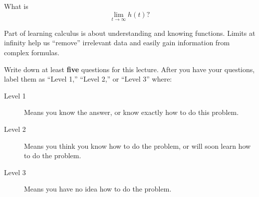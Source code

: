 \documentclass{ximera}
\begin{document}
\begin{problem}
What is 
\[
\lim_{t\to\infty} h(t)?
\]
\begin{multipleChoice}
\end{multipleChoice}
\end{problem}

Part of learning calculus is about understanding and knowing
functions. Limits at infinity help us ``remove'' irrelevant data and
easily gain information from complex formulas.

\begin{problem}
Write down at least \textbf{five} questions for this lecture. After
you have your questions, label them as ``Level 1,'' ``Level 2,'' or ``Level 3'' where:
\begin{description}
\item[Level 1] Means you know the answer, or know exactly how to do this problem.
\item[Level 2] Means you think you know how to do the problem, or will soon learn how to do the problem.
\item[Level 3] Means you have no idea how to do the problem. 
\end{description}
\begin{freeResponse}
\end{freeResponse}
\end{problem}
\end{document}
